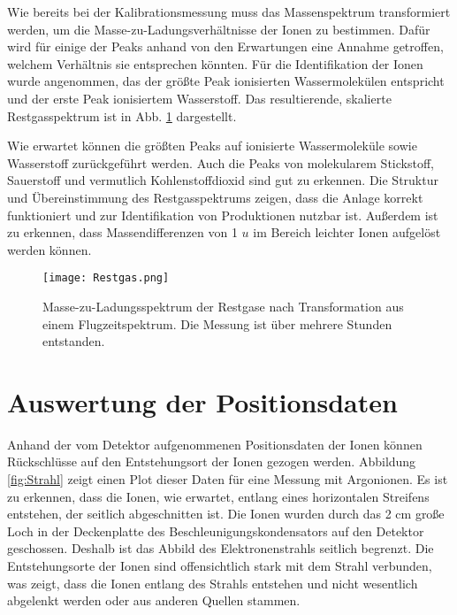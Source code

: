 Wie bereits bei der Kalibrationsmessung muss das Massenspektrum transformiert werden, um die Masse-zu-Ladungsverhältnisse der Ionen zu bestimmen. Dafür wird für einige der Peaks anhand von den Erwartungen eine Annahme getroffen, welchem Verhältnis sie entsprechen könnten. Für die Identifikation der Ionen wurde angenommen, das der größte Peak ionisierten Wassermolekülen
entspricht und der erste Peak ionisiertem Wasserstoff. Das resultierende, skalierte Restgasspektrum ist in Abb. \ref{fig:rest} dargestellt.

Wie erwartet können die größten Peaks auf ionisierte Wassermoleküle sowie Wasserstoff zurückgeführt werden. Auch die Peaks von molekularem Stickstoff, Sauerstoff und vermutlich Kohlenstoffdioxid sind gut zu erkennen. Die Struktur und Übereinstimmung des Restgasspektrums zeigen, dass die Anlage korrekt funktioniert und zur Identifikation von Produktionen nutzbar ist. Außerdem ist zu erkennen, dass Massendifferenzen von 1 $u$ im Bereich leichter Ionen aufgelöst werden können. 

\begin{figure}[h]
    \hspace{-1.1cm}\texttt{[image: Restgas.png]}
    \caption[Masse-zu-Ladungsspektrum der Restgase]{Masse-zu-Ladungsspektrum der Restgase nach Transformation aus einem Flugzeitspektrum. Die Messung ist über mehrere Stunden entstanden.}
    \label{fig:rest}
\end{figure}

\section{Auswertung der Positionsdaten}
Anhand der vom Detektor aufgenommenen Positionsdaten der Ionen können Rückschlüsse auf den Entstehungsort der Ionen gezogen werden. Abbildung \ref{fig:Strahl} zeigt einen Plot dieser Daten für eine Messung mit Argonionen. Es ist zu erkennen, dass die Ionen, wie erwartet, entlang eines horizontalen Streifens entstehen, der seitlich abgeschnitten ist. Die Ionen wurden durch das 2 cm große Loch in der Deckenplatte des Beschleunigungskondensators auf den Detektor geschossen. Deshalb ist das Abbild des Elektronenstrahls seitlich begrenzt. Die Entstehungsorte der Ionen sind offensichtlich stark mit dem Strahl verbunden, was zeigt, dass die Ionen entlang des Strahls entstehen und nicht wesentlich abgelenkt werden oder aus anderen Quellen stammen.

